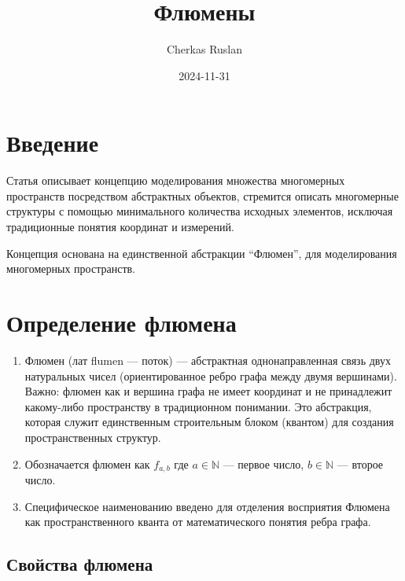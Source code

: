 \documentclass[final]{article}
\begin{document}
    \title{Флюмены}
    \author{Cherkas Ruslan}
    \date{2024-11-31}

    \maketitle
    \tableofcontents

    \section{Введение}

        Статья описывает концепцию моделирования множества многомерных 
        пространств посредством абстрактных объектов, стремится описать 
        многомерные структуры с помощью минимального количества исходных 
        элементов, исключая традиционные понятия координат и измерений.

        Концепция основана на единственной абстракции ``Флюмен'', для 
        моделирования многомерных пространств.

    \section{Определение флюмена} 

        \begin{enumerate}

            \item Флюмен (лат flumen — поток) — абстрактная однонаправленная 
            связь двух натуральных чисел (ориентированное ребро графа между 
            двумя вершинами). Важно: флюмен как и вершина графа не имеет 
            координат и не принадлежит какому-либо пространству в традиционном 
            понимании. Это абстракция, которая служит единственным строительным 
            блоком (квантом) для создания пространственных структур.

            \item Обозначается флюмен как \( f_{a,b} \) где \( a \in \mathbb{N} \) — 
            первое число, \( b \in \mathbb{N} \) — второе число.

            \item Специфическое наименованию введено для отделения восприятия 
            Флюмена как пространственного кванта от математического понятия ребра 
            графа.

        \end{enumerate}



    \subsection{Свойства флюмена}
\end{document}
